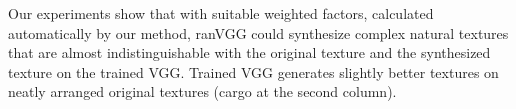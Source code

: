 \documentclass{article}
\begin{document}
Our experiments show that with suitable weighted factors, calculated automatically by our method, %
ranVGG could synthesize complex natural textures that are almost indistinguishable with the original texture and the synthesized texture on the trained VGG.
Trained VGG generates slightly better textures on neatly arranged original textures (cargo at the second column).

\end{document}

